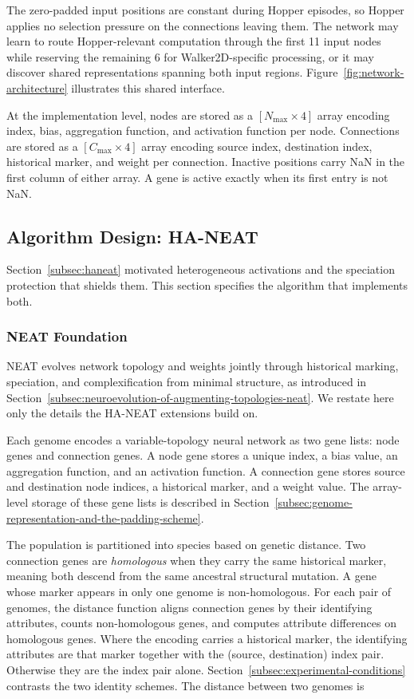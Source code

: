 \documentclass[12pt]{article}
\begin{document}
The zero-padded input positions are constant during Hopper episodes, so Hopper applies no selection pressure on the connections leaving them.
The network may learn to route Hopper-relevant computation through the first 11 input nodes while reserving the remaining 6 for Walker2D-specific processing, or it may discover shared representations spanning both input regions.
Figure~\ref{fig:network-architecture} illustrates this shared interface.

At the implementation level, nodes are stored as a $[N_{\max} \times 4]$ array encoding index, bias, aggregation function, and activation function per node.
Connections are stored as a $[C_{\max} \times 4]$ array encoding source index, destination index, historical marker, and weight per connection.
Inactive positions carry NaN in the first column of either array. A gene is active exactly when its first entry is not NaN.


\subsection{Algorithm Design: HA-NEAT}
\label{subsec:algorithm-design-ha-neat}

Section~\ref{subsec:haneat} motivated heterogeneous activations and the speciation protection that shields them. This section specifies the algorithm that implements both.

\subsubsection{NEAT Foundation}
\label{subsubsec:neat-foundation}

NEAT evolves network topology and weights jointly through historical marking, speciation, and complexification from minimal structure, as introduced in Section~\ref{subsec:neuroevolution-of-augmenting-topologies-neat}.
We restate here only the details the HA-NEAT extensions build on.

Each genome encodes a variable-topology neural network as two gene lists: node genes and connection genes.
A node gene stores a unique index, a bias value, an aggregation function, and an activation function.
A connection gene stores source and destination node indices, a historical marker, and a weight value.
The array-level storage of these gene lists is described in Section~\ref{subsec:genome-representation-and-the-padding-scheme}.

The population is partitioned into species based on genetic distance.
Two connection genes are \emph{homologous} when they carry the same historical marker, meaning both descend from the same ancestral structural mutation. A gene whose marker appears in only one genome is non-homologous.
For each pair of genomes, the distance function aligns connection genes by their identifying attributes, counts non-homologous genes, and computes attribute differences on homologous genes.
Where the encoding carries a historical marker, the identifying attributes are that marker together with the (source, destination) index pair. Otherwise they are the index pair alone. Section~\ref{subsec:experimental-conditions} contrasts the two identity schemes.
The distance between two genomes is
\end{document}
